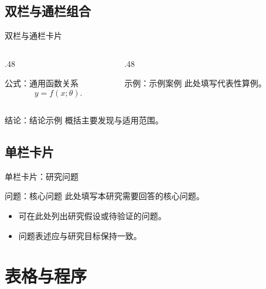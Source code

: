 \documentclass[hyperref, UTF8, CJK, aspectratio=169]{beamer}
\begin{document}
\subsection{双栏与通栏组合}
\begin{frame}{双栏与通栏卡片}
  \begin{columns}[T,onlytextwidth]
    \begin{column}{.48\textwidth}
      \begin{ResearchCard}{公式：通用函数关系}
        \[
          y = f(x;\theta).
        \]
      \end{ResearchCard}
    \end{column}
    \begin{column}{.48\textwidth}
      \begin{ResearchCard}{示例：示例案例}
        此处填写代表性算例。
      \end{ResearchCard}
    \end{column}
  \end{columns}
  \begin{ResearchCard}{结论：结论示例}
    概括主要发现与适用范围。
  \end{ResearchCard}
\end{frame}

\subsection{单栏卡片}
\begin{frame}{单栏卡片：研究问题}
  \begin{ResearchCard}{问题：核心问题}
    此处填写本研究需要回答的核心问题。
  \end{ResearchCard}
  \vspace{.5em}
  \begin{itemize}
    \item 可在此处列出研究假设或待验证的问题。
    \item 问题表述应与研究目标保持一致。
  \end{itemize}
\end{frame}

\section{表格与程序}
\end{document}
